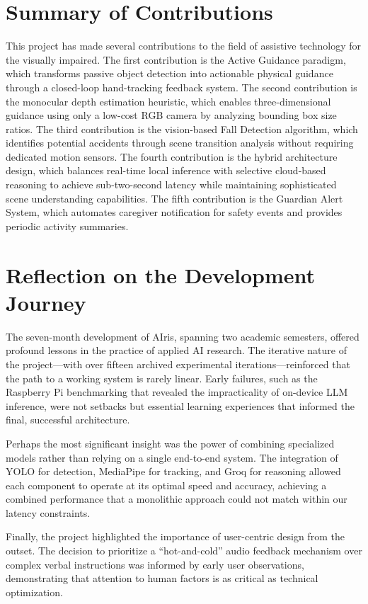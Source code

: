 \documentclass[12pt,a4paper]{report}
\begin{document}
\section{Summary of Contributions}

This project has made several contributions to the field of assistive technology for the visually impaired. The first contribution is the Active Guidance paradigm, which transforms passive object detection into actionable physical guidance through a closed-loop hand-tracking feedback system. The second contribution is the monocular depth estimation heuristic, which enables three-dimensional guidance using only a low-cost RGB camera by analyzing bounding box size ratios. The third contribution is the vision-based Fall Detection algorithm, which identifies potential accidents through scene transition analysis without requiring dedicated motion sensors. The fourth contribution is the hybrid architecture design, which balances real-time local inference with selective cloud-based reasoning to achieve sub-two-second latency while maintaining sophisticated scene understanding capabilities. The fifth contribution is the Guardian Alert System, which automates caregiver notification for safety events and provides periodic activity summaries.

\section{Reflection on the Development Journey}

The seven-month development of AIris, spanning two academic semesters, offered profound lessons in the practice of applied AI research. The iterative nature of the project---with over fifteen archived experimental iterations---reinforced that the path to a working system is rarely linear. Early failures, such as the Raspberry Pi benchmarking that revealed the impracticality of on-device LLM inference, were not setbacks but essential learning experiences that informed the final, successful architecture.

Perhaps the most significant insight was the power of combining specialized models rather than relying on a single end-to-end system. The integration of YOLO for detection, MediaPipe for tracking, and Groq for reasoning allowed each component to operate at its optimal speed and accuracy, achieving a combined performance that a monolithic approach could not match within our latency constraints.

Finally, the project highlighted the importance of user-centric design from the outset. The decision to prioritize a ``hot-and-cold'' audio feedback mechanism over complex verbal instructions was informed by early user observations, demonstrating that attention to human factors is as critical as technical optimization.
\end{document}

